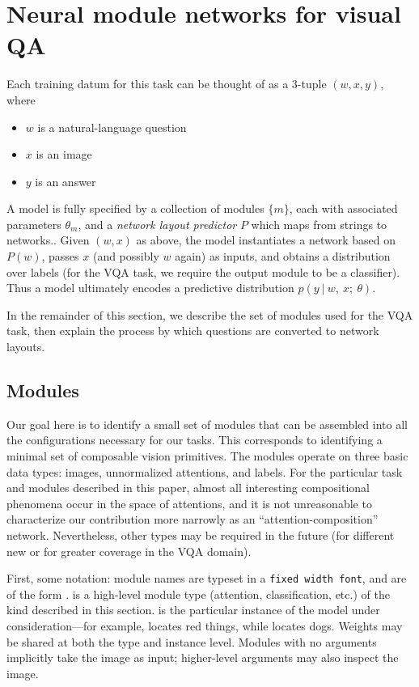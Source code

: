 
\section{Neural module networks for visual QA}

Each training datum for this task can be thought of as a 3-tuple $(w, x, y)$, where
\begin{itemize}
  \setlength\itemsep{0em}
  \item $w$ is a natural-language question
  \item $x$ is an image
  \item $y$ is an answer
\end{itemize}
A model is fully specified by a collection of modules $\{ m \}$, each with
associated parameters $\theta_m$, and a \emph{network layout predictor} $P$
which maps from strings to networks.. Given $(w, x)$ as above, the model
instantiates a network based on $P(w)$, passes $x$ (and possibly $w$ again) as
inputs, and obtains a distribution over labels (for the VQA task, we require the
output module to be a classifier). Thus a model ultimately encodes a predictive
distribution $p(y\ |\ w,\ x;\ \theta)$.

In the remainder of this section, we describe the set of modules used for the
VQA task, then explain the process by which questions are converted to network
layouts.

\subsection{Modules}

Our goal here is to identify a small set of modules that can be assembled into
all the configurations necessary for our tasks. This corresponds to identifying
a minimal set of composable vision primitives. The modules operate on three
basic data types: images, unnormalized attentions, and labels.  For the
particular task and modules described in this paper, almost all interesting
compositional phenomena occur in the space of attentions, and it is not
unreasonable to characterize our contribution more narrowly as an
``attention-composition'' network. Nevertheless, other types may be required in
the future (for different new or for greater coverage in the VQA domain).

First, some notation: module names are typeset in a {\tt fixed width font}, and
are of the form .  is a
high-level module type (attention, classification, etc.) of the kind described
in this section.  is the particular instance of the model under
consideration---for example,  locates red things, while
 locates dogs. Weights may be shared at both the type and
instance level. Modules with no arguments implicitly take the image as input;
higher-level arguments may also inspect the image.

